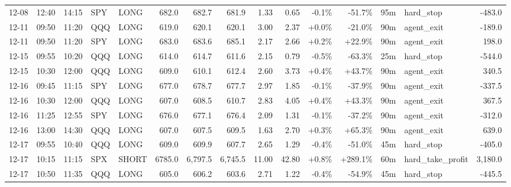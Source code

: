 \documentclass[11pt,a4paper,twoside]{article}
\begin{document}
\begin{landscape}
\begin{center}
\begin{longtable}{>{\color{txtmain}}l l l l l r r r r r r r r >{\color{txtmain}}l r}
12-08 & 12:40 & 14:15 & SPY & LONG & 682.0 & 682.7 & 681.9 & 1.33 & 0.65 & \textcolor{lossred}{-0.1\%} & \textcolor{lossred}{-51.7\%} & 95m & hard\_stop & \textcolor{lossred}{-483.0} \\
12-11 & 09:50 & 11:20 & QQQ & LONG & 619.0 & 620.1 & 620.1 & 3.00 & 2.37 & \textcolor{wingreen}{+0.0\%} & \textcolor{lossred}{-21.0\%} & 90m & agent\_exit & \textcolor{lossred}{-189.0} \\
12-11 & 09:50 & 11:20 & SPY & LONG & 683.0 & 683.6 & 685.1 & 2.17 & 2.66 & \textcolor{wingreen}{+0.2\%} & \textcolor{wingreen}{+22.9\%} & 90m & agent\_exit & \textcolor{wingreen}{198.0} \\
12-15 & 09:55 & 10:20 & QQQ & LONG & 614.0 & 614.7 & 611.6 & 2.15 & 0.79 & \textcolor{lossred}{-0.5\%} & \textcolor{lossred}{-63.3\%} & 25m & hard\_stop & \textcolor{lossred}{-544.0} \\
12-15 & 10:30 & 12:00 & QQQ & LONG & 609.0 & 610.1 & 612.4 & 2.60 & 3.73 & \textcolor{wingreen}{+0.4\%} & \textcolor{wingreen}{+43.7\%} & 90m & agent\_exit & \textcolor{wingreen}{340.5} \\
12-16 & 09:45 & 11:15 & SPY & LONG & 677.0 & 678.7 & 677.7 & 2.97 & 1.85 & \textcolor{lossred}{-0.1\%} & \textcolor{lossred}{-37.9\%} & 90m & agent\_exit & \textcolor{lossred}{-337.5} \\
12-16 & 10:30 & 12:00 & QQQ & LONG & 607.0 & 608.5 & 610.7 & 2.83 & 4.05 & \textcolor{wingreen}{+0.4\%} & \textcolor{wingreen}{+43.3\%} & 90m & agent\_exit & \textcolor{wingreen}{367.5} \\
12-16 & 11:25 & 12:55 & SPY & LONG & 676.0 & 677.1 & 676.4 & 2.09 & 1.31 & \textcolor{lossred}{-0.1\%} & \textcolor{lossred}{-37.2\%} & 90m & agent\_exit & \textcolor{lossred}{-312.0} \\
12-16 & 13:00 & 14:30 & QQQ & LONG & 607.0 & 607.5 & 609.5 & 1.63 & 2.70 & \textcolor{wingreen}{+0.3\%} & \textcolor{wingreen}{+65.3\%} & 90m & agent\_exit & \textcolor{wingreen}{639.0} \\
12-17 & 09:55 & 10:40 & QQQ & LONG & 609.0 & 609.9 & 607.7 & 2.65 & 1.29 & \textcolor{lossred}{-0.4\%} & \textcolor{lossred}{-51.0\%} & 45m & hard\_stop & \textcolor{lossred}{-405.0} \\
12-17 & 10:15 & 11:15 & SPX & SHORT & 6785.0 & 6,797.5 & 6,745.5 & 11.00 & 42.80 & \textcolor{wingreen}{+0.8\%} & \textcolor{wingreen}{+289.1\%} & 60m & hard\_take\_profit & \textcolor{wingreen}{3,180.0} \\
12-17 & 10:50 & 11:35 & QQQ & LONG & 605.0 & 606.2 & 603.6 & 2.71 & 1.22 & \textcolor{lossred}{-0.4\%} & \textcolor{lossred}{-54.9\%} & 45m & hard\_stop & \textcolor{lossred}{-445.5} \\

\end{longtable}
\end{center}
\end{landscape}
\end{document}
